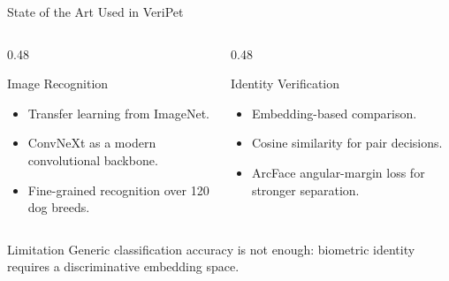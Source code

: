 \documentclass[aspectratio=169,11pt]{beamer}
\begin{document}
\begin{frame}{State of the Art Used in VeriPet}
  \begin{columns}[T,onlytextwidth]
    \begin{column}{0.48\textwidth}
      \begin{block}{Image Recognition}
        \begin{itemize}
          \item Transfer learning from ImageNet.
          \item ConvNeXt as a modern convolutional backbone.
          \item Fine-grained recognition over 120 dog breeds.
        \end{itemize}
      \end{block}
    \end{column}
    \begin{column}{0.48\textwidth}
      \begin{block}{Identity Verification}
        \begin{itemize}
          \item Embedding-based comparison.
          \item Cosine similarity for pair decisions.
          \item ArcFace angular-margin loss for stronger separation.
        \end{itemize}
      \end{block}
    \end{column}
  \end{columns}

  \vspace{0.25cm}
  \begin{alertblock}{Limitation}
    Generic classification accuracy is not enough: biometric identity requires a discriminative embedding space.
  \end{alertblock}
\end{frame}
\end{document}

